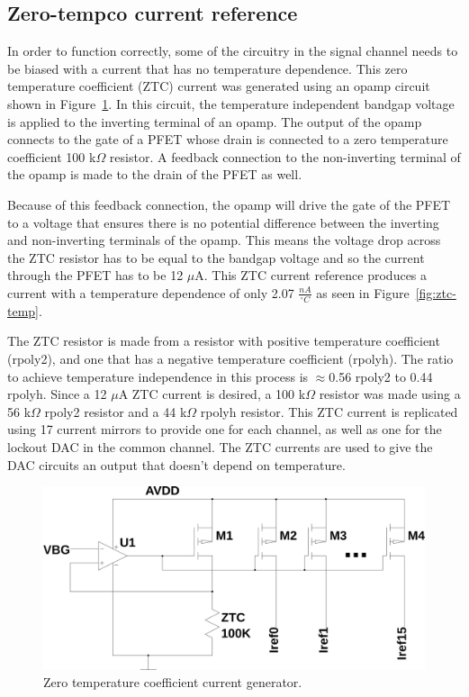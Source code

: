 \documentclass[12pt,oneside,final]{siuethesis}
\theoremstyle{definition}
\begin{document}
\subsection{Zero-tempco current reference}
\par In order to function correctly, some of the circuitry in the signal channel needs to be biased with a current that has no temperature dependence. This zero temperature coefficient (ZTC) current was generated using an opamp circuit shown in Figure~\ref{fig:ztc}. In this circuit, the temperature independent bandgap voltage is applied to the inverting terminal of an opamp. The output of the opamp connects to the gate of a PFET whose drain is connected to a zero temperature coefficient 100 k$\Omega$ resistor. A feedback connection to the non-inverting terminal of the opamp is made to the drain of the PFET as well. 
\par Because of this feedback connection, the opamp will drive the gate of the PFET to a voltage that ensures there is no potential difference between the inverting and non-inverting terminals of the opamp. This means the voltage drop across the ZTC resistor has to be equal to the bandgap voltage and so the current through the PFET has to be 12 $\mu$A. This ZTC current reference produces a current with a temperature dependence of only 2.07 $\frac{nA}{^{\circ}C}$ as seen in Figure~\ref{fig:ztc-temp}.
\par The ZTC resistor is made from a resistor with positive temperature coefficient (rpoly2), and one that has a negative temperature coefficient (rpolyh). The ratio to achieve temperature independence in this process is $\approx$0.56 rpoly2 to 0.44 rpolyh. Since a 12 $\mu$A ZTC current is desired, a 100 k$\Omega$ resistor was made using a 56 k$\Omega$ rpoly2 resistor and a 44 k$\Omega$ rpolyh resistor. This ZTC current is replicated using 17 current mirrors to provide one for each channel, as well as one for the lockout DAC in the common channel. The ZTC currents are used to give the DAC circuits an output that doesn't depend on temperature.
\begin{figure}[htbp!]
\centering
\includegraphics[scale=.36,keepaspectratio=true]{../LTspice_Drawings/ztc_iref/circuit.png} 
\caption{Zero temperature coefficient current generator.}
\label{fig:ztc}
\end{figure}
\end{document}
